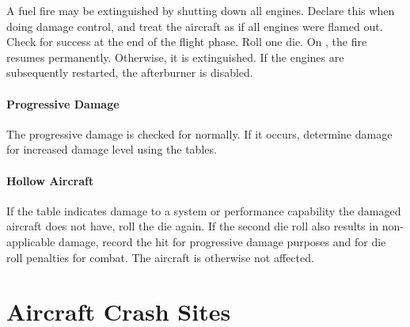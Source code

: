 \begin{advancedrules}
{A fuel fire may be extinguished by shutting down all engines. Declare this when doing damage control, and treat the aircraft as if all engines were flamed out. Check for success at the end of the flight phase. Roll one die. On , the fire resumes permanently. Otherwise, it is extinguished. If the engines are subsequently restarted, the afterburner is disabled.

\paragraph{Progressive Damage} The progressive damage is checked for normally. If it occurs, determine damage for increased damage level using the tables.

\paragraph{Hollow Aircraft} If the table indicates damage to a system or performance capability the damaged aircraft does not have, roll the die again. If the second die roll also results in non-applicable damage, record the hit for progressive damage purposes and for die roll penalties for combat. The aircraft is otherwise not affected.

}

\section{Aircraft Crash Sites}


\end{advancedrules}
